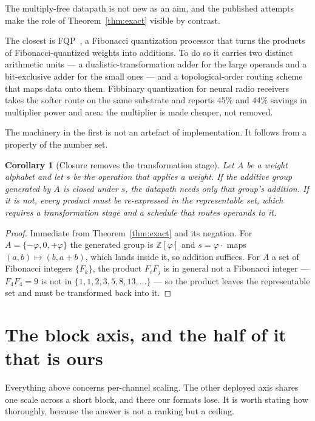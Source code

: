 \documentclass[11pt]{article}
\newtheorem{corollary}{Corollary}
\theoremstyle{definition}
\begin{document}
The multiply-free datapath is not new as an aim, and the published attempts make
the role of Theorem~\ref{thm:exact} visible by contrast.

The closest is FQP~\cite{fqp}, a Fibonacci quantization processor that turns the
products of Fibonacci-quantized weights into additions. To do so it carries two
distinct arithmetic units --- a dualistic-transformation adder for the large
operands and a bit-exclusive adder for the small ones --- and a topological-order
routing scheme that maps data onto them. Fibbinary quantization for neural radio
receivers~\cite{fibbinary} takes the softer route on the same substrate and
reports $45\%$ and $44\%$ savings in multiplier power and area: the multiplier is
made cheaper, not removed.

The machinery in the first is not an artefact of implementation. It follows from
a property of the number set.

\begin{corollary}[Closure removes the transformation stage]\label{cor:closure}
Let $A$ be a weight alphabet and let $s$ be the operation that applies a weight.
If the additive group generated by $A$ is closed under $s$, the datapath needs
only that group's addition. If it is not, every product must be re-expressed in
the representable set, which requires a transformation stage and a schedule that
routes operands to it.
\end{corollary}
\begin{proof}
Immediate from Theorem~\ref{thm:exact} and its negation. For
$A=\{-\varphi,0,+\varphi\}$ the generated group is $\mathbb{Z}[\varphi]$ and
$s=\varphi\cdot$ maps $(a,b)\mapsto(b,a+b)$, which lands inside it, so addition
suffices. For $A$ a set of Fibonacci integers $\{F_k\}$, the product $F_iF_j$ is
in general not a Fibonacci integer --- $F_4F_4=9$ is not in
$\{1,1,2,3,5,8,13,\dots\}$ --- so the product leaves the representable set and
must be transformed back into it.
\end{proof}



\section{The block axis, and the half of it that is ours}
\label{sec:blockbound}

Everything above concerns per-channel scaling. The other deployed axis shares
one scale across a short block, and there our formats lose. It is worth stating
how thoroughly, because the answer is not a ranking but a ceiling.
\end{document}
